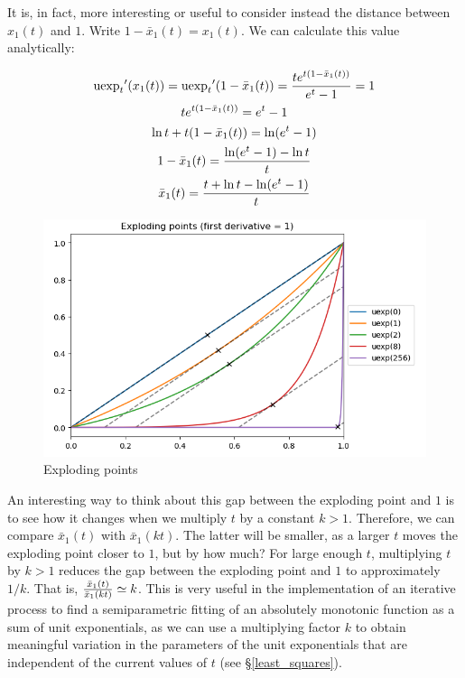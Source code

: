 \documentclass[12pt,a4paper]{article}
\newcommand{\uexp}[1] {{\text{uexp}_{#1}}}
\begin{document}
It is, in fact, more interesting or useful to consider instead the distance between $x_1(t)$ and $1$. Write $1 - {\bar{x}}_1(t) = x_1(t)$. We can calculate this value analytically:

\begin{multline}
\uexp{t}^{\prime}(x_1(t)) = \uexp{t}^{\prime}(1 - {\bar{x}}_1(t)) = {{t e^{t (1 - {\bar{x}}_1(t))}} \over {e^t - 1}} = 1\\
t e^{t (1 - {\bar{x}}_1(t))} = e^t - 1\\
\ln t + t (1 - {\bar{x}}_1(t)) = \ln (e^t - 1)\\
1 - {\bar{x}}_1(t) = {{\ln (e^t - 1) - \ln t} \over {t}}\\
{\bar{x}}_1(t) = {{t + \ln t - \ln (e^t - 1)} \over {t}}\\
\end{multline}

\begin{figure}
\caption{\label{fig_exploding_points}Exploding points}
\centering
\includegraphics[width=\textwidth]{exploding_points.png}
\end{figure}

An interesting way to think about this gap between the exploding point and $1$ is to see how it changes when we multiply $t$ by a constant $k > 1$. Therefore, we can compare ${\bar{x}}_1(t)$ with ${\bar{x}}_1(kt)$. The latter will be smaller, as a larger $t$ moves the exploding point closer to $1$, but by how much? For large enough $t$, multiplying $t$ by $k > 1$ reduces the gap between the exploding point and $1$ to approximately $1/k$. That is, ${{{\bar{x}}_1(t)} \over {{\bar{x}}_1(kt)}} \simeq k$. This is very useful in the implementation of an iterative process to find a semiparametric fitting of an absolutely monotonic function as a sum of unit exponentials, as we can use a multiplying factor $k$ to obtain meaningful variation in the parameters of the unit exponentials that are independent of the current values of $t$ (see \S \ref{least_squares}).\\
\end{document}
